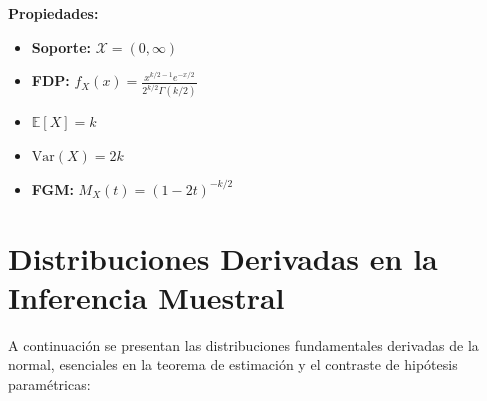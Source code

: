 \vspace{0.8em}
\noindent
\begin{minipage}[c]{0.45\textwidth}
    \textbf{Propiedades:}
    \begin{itemize}\setlength\itemsep{0.3em}
        \item \textbf{Soporte:} $\mathcal{X} = (0, \infty)$
        \item \textbf{FDP:} $f_X(x) = \frac{x^{k/2-1} e^{-x/2}}{2^{k/2}\Gamma(k/2)}$
        \item $\mathbb{E}[X] = k$
        \item $\text{Var}(X) = 2k$
        \item \textbf{FGM:} $M_X(t) = (1 - 2t)^{-k/2}$
    \end{itemize}
\end{minipage}%
\hfill
\begin{minipage}[c]{0.5\textwidth}
    \begin{center}
    \end{center}
\end{minipage}

\vspace{2.5em}

\section{Distribuciones Derivadas en la Inferencia Muestral}
\vspace{0.8em}

\noindent A continuación se presentan las distribuciones fundamentales derivadas de la normal, esenciales en la teorema de estimación y el contraste de hipótesis paramétricas:

\vspace{1.5em}

